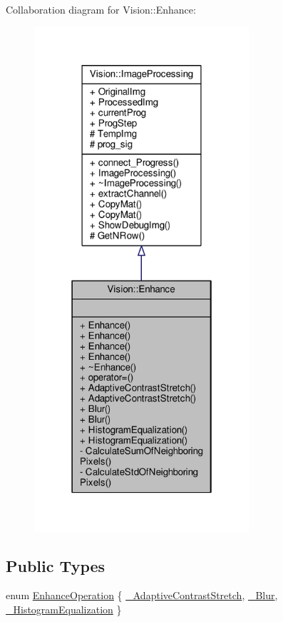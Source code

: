 Collaboration diagram for Vision\+:\+:Enhance\+:\nopagebreak
\begin{figure}[H]
\begin{center}
\leavevmode
\includegraphics[width=226pt]{class_vision_1_1_enhance__coll__graph}
\end{center}
\end{figure}
\subsection*{Public Types}
\begin{DoxyCompactItemize}
\item 
enum \hyperlink{class_vision_1_1_enhance_a36caf2ddf5cb2575bfae8bcdca04e58e}{Enhance\+Operation} \{ \hyperlink{class_vision_1_1_enhance_a36caf2ddf5cb2575bfae8bcdca04e58eae6586f260ee8f32c3b9497731524e9ae}{\+\_\+\+Adaptive\+Contrast\+Stretch}, 
\hyperlink{class_vision_1_1_enhance_a36caf2ddf5cb2575bfae8bcdca04e58ea5245bfc56341cd91a53b2fcb676c8fc8}{\+\_\+\+Blur}, 
\hyperlink{class_vision_1_1_enhance_a36caf2ddf5cb2575bfae8bcdca04e58eaa1c2d6e2989e60cf5a5f0c320f83bc08}{\+\_\+\+Histogram\+Equalization}
 \}
\end{DoxyCompactItemize}
